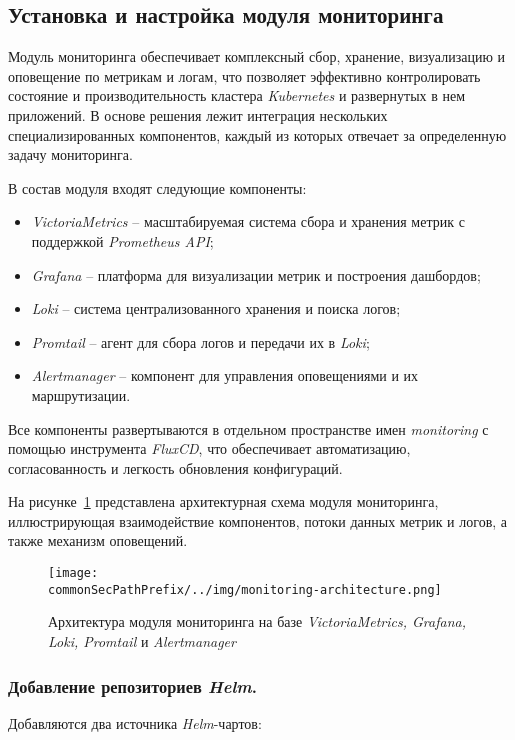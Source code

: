 \subsection{Установка и настройка модуля мониторинга}

Модуль мониторинга обеспечивает комплексный сбор, хранение, визуализацию и оповещение по метрикам и логам, что позволяет эффективно контролировать состояние и производительность кластера \textit{Kubernetes} и развернутых в нем приложений. В основе решения лежит интеграция нескольких специализированных компонентов, каждый из которых отвечает за определенную задачу мониторинга.

В состав модуля входят следующие компоненты:

\begin{itemize}
    \item \textit{VictoriaMetrics}\cite{victoriametrics} -- масштабируемая система сбора и хранения метрик с поддержкой \textit{Prometheus API};
    \item \textit{Grafana} -- платформа для визуализации метрик и построения дашбордов;
    \item \textit{Loki}\cite{loki} -- система централизованного хранения и поиска логов;
    \item \textit{Promtail} -- агент для сбора логов и передачи их в \textit{Loki};
    \item \textit{Alertmanager} -- компонент для управления оповещениями и их маршрутизации.
\end{itemize}

Все компоненты развертываются в отдельном пространстве имен \textit{monitoring} с помощью инструмента \textit{FluxCD}, что обеспечивает автоматизацию, согласованность и легкость обновления конфигураций.

На рисунке~\ref{fig:monitoring-architecture} представлена архитектурная схема модуля мониторинга, иллюстрирующая взаимодействие компонентов, потоки данных метрик и логов, а также механизм оповещений.

\begin{figure}[ht]
    \centering
    \texttt{[image: \\commonSecPathPrefix/../img/monitoring-architecture.png]}
    \caption{Архитектура модуля мониторинга на базе \textit{VictoriaMetrics, Grafana, Loki, Promtail} и \textit{Alertmanager}}
    \label{fig:monitoring-architecture}
\end{figure}

\subsubsection{Добавление репозиториев \textit{Helm}.} Добавляются два источника \textit{Helm}-чартов:

